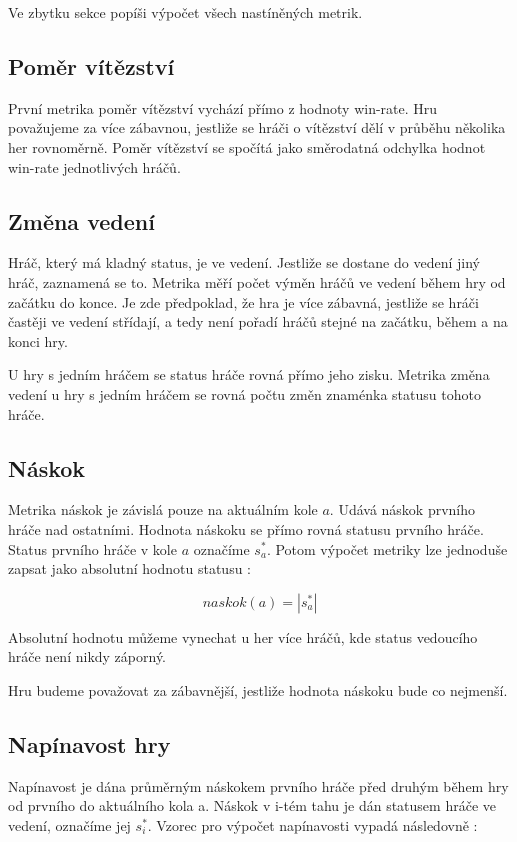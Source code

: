 Ve zbytku sekce popíši výpočet všech nastíněných metrik.

\subsection{Poměr vítězství}

První metrika poměr vítězství vychází přímo z hodnoty win-rate. Hru považujeme za více zábavnou, jestliže se hráči o vítězství dělí v průběhu několika her rovnoměrně. Poměr vítězství se spočítá jako směrodatná odchylka hodnot win-rate jednotlivých hráčů.

\subsection{Změna vedení}

Hráč, který má kladný status, je ve vedení. Jestliže se dostane do vedení jiný hráč, zaznamená se to. Metrika měří počet výměn hráčů ve vedení během hry od začátku do konce. Je zde předpoklad, že hra je více zábavná, jestliže se hráči častěji ve vedení střídají, a tedy není pořadí hráčů stejné na začátku, během a na konci hry. 

U hry s jedním hráčem se status hráče rovná přímo jeho zisku. Metrika změna vedení u hry s jedním hráčem se rovná počtu změn znaménka statusu tohoto hráče.

\subsection{Náskok}

Metrika náskok je závislá pouze na aktuálním kole $a$. Udává náskok prvního hráče nad ostatními. Hodnota náskoku se přímo rovná statusu prvního hráče. Status prvního hráče v kole $a$ označíme $s^*_a$. Potom výpočet metriky lze jednoduše zapsat jako absolutní hodnotu statusu :

	\[
	naskok(a) = |s^*_a|
\]

Absolutní hodnotu můžeme vynechat u her více hráčů, kde status vedoucího hráče není nikdy záporný.

Hru budeme považovat za zábavnější, jestliže hodnota náskoku bude co nejmenší.

\subsection{Napínavost hry}
Napínavost je dána průměrným náskokem prvního hráče před druhým během hry od prvního do aktuálního kola a. Náskok v i-tém tahu je dán statusem hráče ve vedení, označíme jej $s^*_i$. Vzorec pro výpočet napínavosti vypadá následovně :

